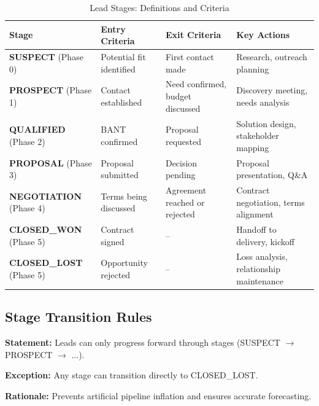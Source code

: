 \begin{table}[htbp]
\centering
\caption{Lead Stages: Definitions and Criteria}
\label{tab:bn-stages}
\renewcommand{\arraystretch}{1.4}
\begin{tabular}{@{}p{2.5cm}p{3cm}p{3cm}p{4cm}@{}}
\toprule
\textbf{Stage} & \textbf{Entry Criteria} & \textbf{Exit Criteria} & \textbf{Key Actions} \\
\midrule
\textbf{SUSPECT} (Phase 0) &
Potential fit identified &
First contact made &
Research, outreach planning \\

\textbf{PROSPECT} (Phase 1) &
Contact established &
Need confirmed, budget discussed &
Discovery meeting, needs analysis \\

\textbf{QUALIFIED} (Phase 2) &
BANT confirmed\footnotemark &
Proposal requested &
Solution design, stakeholder mapping \\

\textbf{PROPOSAL} (Phase 3) &
Proposal submitted &
Decision pending &
Proposal presentation, Q\&A \\

\textbf{NEGOTIATION} (Phase 4) &
Terms being discussed &
Agreement reached or rejected &
Contract negotiation, terms alignment \\

\textbf{CLOSED\_WON} (Phase 5) &
Contract signed &
-- &
Handoff to delivery, kickoff \\

\textbf{CLOSED\_LOST} (Phase 5) &
Opportunity rejected &
-- &
Loss analysis, relationship maintenance \\
\bottomrule
\end{tabular}
\end{table}

\subsection{Stage Transition Rules}

\begin{tcolorbox}[colback=gray!5!white, colframe=gray!75!black,
    title=Rule LM-1: Forward Progression]
\textbf{Statement:} Leads can only progress forward through stages (SUSPECT $\to$ PROSPECT $\to$ ...).

\textbf{Exception:} Any stage can transition directly to CLOSED\_LOST.

\textbf{Rationale:} Prevents artificial pipeline inflation and ensures accurate forecasting.
\end{tcolorbox}

